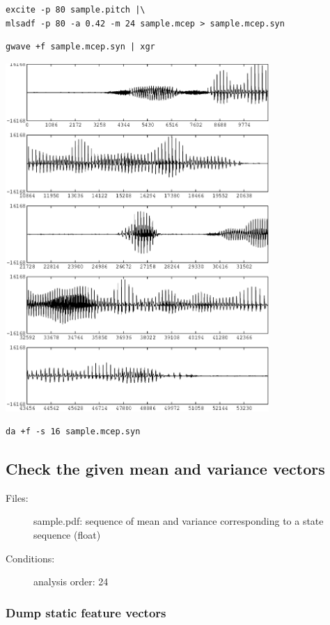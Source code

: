 \documentclass[a4paper]{article}
\begin{document}
\begin{verbatim}
excite -p 80 sample.pitch |\
mlsadf -p 80 -a 0.42 -m 24 sample.mcep > sample.mcep.syn
\end{verbatim}

\begin{verbatim}
gwave +f sample.mcep.syn | xgr
\end{verbatim}

\includegraphics[width=10cm]{sample.mcep.syn.gwave.eps}

\begin{verbatim}
da +f -s 16 sample.mcep.syn
\end{verbatim}

\subsection{Check the given mean and variance vectors}

\begin{description}
\item[Files:]
  sample.pdf: sequence of mean and variance
              corresponding to a state sequence (float)
\item[Conditions:]
  analysis order: 24
\end{description}

\subsubsection{Dump static feature vectors}
\end{document}
